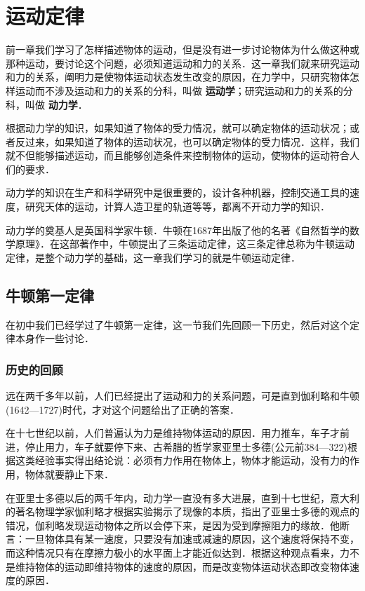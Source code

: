 \chapter{运动定律}

前一章我们学习了怎样描述物体的运动，但是没有进一步讨论物体为什么做这种或那种运动，要讨论这个问题，必须知道运动和力的关系．这一章我们就来研究运动和力的关系，阐明力是使物体运动状态发生改变的原因，在力学中，只研究物体怎样运动而不涉及运动和力的关系的分科，叫做\textbf{ 运动学}；研究运动和力的关系的分科，叫做\textbf{ 动力学}．

根据动力学的知识，如果知道了物体的受力情况，就可以确定物体的运动状况；或者反过来，如果知道了物体的运动状况，也可以确定物体的受力情况．这样，我们就不但能够描述运动，而且能够创造条件来控制物体的运动，使物体的运动符合人们的要求．

动力学的知识在生产和科学研究中是很重要的，设计各种机器，控制交通工具的速度，研究天体的运动，计算人造卫星的轨道等等，都离不开动力学的知识．

动力学的奠基人是英国科学家牛顿．牛顿在1687年出版了他的名著《自然哲学的数学原理》．在这部著作中，牛顿提出了三条运动定律，这三条定律总称为牛顿运动定律，是整个动力学的基础，这一章我们学习的就是牛顿运动定律．

\section{牛顿第一定律}
在初中我们已经学过了牛顿第一定律，这一节我们先回顾一下历史，然后对这个定律本身作一些讨论．

\subsection{历史的回顾}
远在两千多年以前，人们已经提出了运动和力的关系问题，可是直到伽利略和牛顿(1642—1727)时代，才对这个问题给出了正确的答案．

在十七世纪以前，人们普遍认为力是维持物体运动的原因．用力推车，车子才前进，停止用力，车子就要停下来、古希腊的哲学家亚里士多德(公元前384—322)根据这类经验事实得出结论说：必须有力作用在物体上，物体才能运动，没有力的作用，物体就要静止下来．

在亚里士多德以后的两千年内，动力学一直没有多大进展，直到十七世纪，意大利的著名物理学家伽利略才根据实验揭示了现像的本质，指出了亚里士多德的观点的错况，伽利略发现运动物体之所以会停下来，是因为受到摩擦阻力的缘故．他断言：一旦物体具有某一速度，只要没有加速或减速的原因，这个速度将保持不变，而这种情况只有在摩擦力极小的水平面上才能近似达到．根据这种观点看来，力不是维持物体的运动即维持物体的速度的原因，而是改变物体运动状态即改变物体速度的原因．

